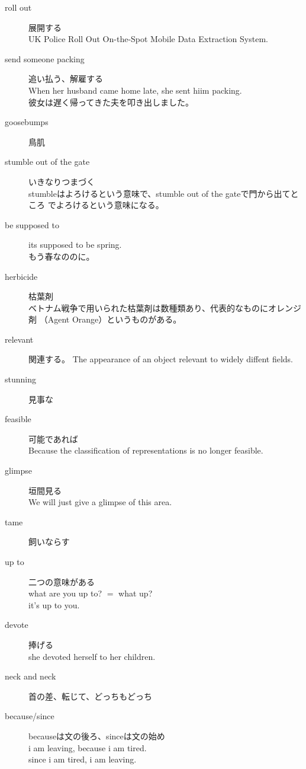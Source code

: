 \begin{description}
		\item[roll out] 展開する \\
		UK Police Roll Out On-the-Spot Mobile Data Extraction System.
		\item[send someone packing] 追い払う、解雇する \\
		When her husband came home late, she sent hiim packing. \\
		彼女は遅く帰ってきた夫を叩き出しました。
		\item[goosebumps] 鳥肌
		\item[stumble out of the gate] いきなりつまづく \\
		stumbleはよろけるという意味で、stumble out of the gateで門から出てところ
		でよろけるという意味になる。
		\item[be supposed to] its supposed to be spring. \\
		もう春なののに。
		\item[herbicide] 枯葉剤 \\
		ベトナム戦争で用いられた枯葉剤は数種類あり、代表的なものにオレンジ剤
		（Agent Orange）というものがある。
		\item[relevant] 関連する。
		The appearance of an object relevant to widely diffent fields.
		\item[stunning] 見事な
		\item[feasible] 可能であれば \\
		Because the classification of representations is no longer feasible.
		\item[glimpse] 垣間見る \\
		We will just give a glimpse of this area.
		\item[tame] 飼いならす \\
		\item[up to] 二つの意味がある \\
		what are you up to? $=$  what up? \\
		it's up to you.
		\item[devote] 捧げる \\
		she devoted herself to her children.
		\item[neck and neck] 首の差、転じて、どっちもどっち \\
		\item[because/since] becauseは文の後ろ、sinceは文の始め \\
		i am leaving, because i am tired. \\
		since i am tired,  i am leaving.
	\end{description} %


